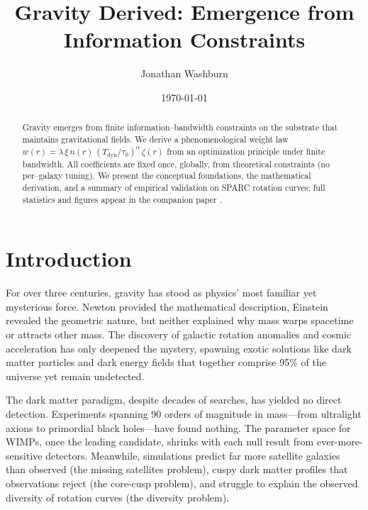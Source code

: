 \documentclass[twocolumn,prd,amsmath,amssymb,aps,superscriptaddress,nofootinbib]{revtex4-2}
\begin{document}
\title{Gravity Derived: Emergence from Information Constraints}

\author{Jonathan Washburn}

\date{\today}

\begin{abstract}
\noindent
Gravity emerges from finite information–bandwidth constraints on the substrate that maintains gravitational fields. We derive a phenomenological weight law $w(r)=\lambda\,\xi\,n(r)\,(T_{\text{dyn}}/\tau_0)^\alpha\,\zeta(r)$ from an optimization principle under finite bandwidth. All coefficients are fixed once, globally, from theoretical constraints (no per–galaxy tuning). We present the conceptual foundations, the mathematical derivation, and a summary of empirical validation on SPARC rotation curves; full statistics and figures appear in the companion paper \cite{Washburn2025a}.
\end{abstract}

\maketitle

\section{Introduction}

For over three centuries, gravity has stood as physics' most familiar yet mysterious force. Newton provided the mathematical description, Einstein revealed the geometric nature, but neither explained why mass warps spacetime or attracts other mass. The discovery of galactic rotation anomalies \cite{Rubin1970} and cosmic acceleration \cite{Riess1998} has only deepened the mystery, spawning exotic solutions like dark matter particles and dark energy fields that together comprise 95\% of the universe yet remain undetected.

The dark matter paradigm, despite decades of searches, has yielded no direct detection. Experiments spanning 90 orders of magnitude in mass---from ultralight axions to primordial black holes---have found nothing. The parameter space for WIMPs, once the leading candidate, shrinks with each null result from ever-more-sensitive detectors. Meanwhile, simulations predict far more satellite galaxies than observed (the missing satellites problem), cuspy dark matter profiles that observations reject (the core-cusp problem), and struggle to explain the observed diversity of rotation curves (the diversity problem).
\end{document}
